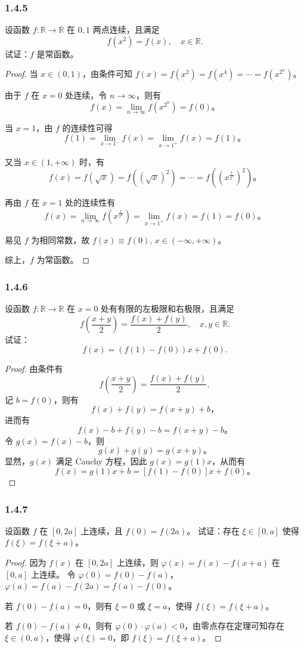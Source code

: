 \documentclass[12pt]{ctexart}
\begin{document}
\subsubsection*{1.4.5}
设函数 $f: \mathbb{R} \to \mathbb{R}$ 在 $0,1$ 两点连续，且满足
\[
f(x^2) = f(x), \quad x \in \mathbb{R}.
\]
试证：$f$ 是常函数。

\begin{proof}
当 $x \in (0,1)$，由条件可知 $f(x) = f(x^2) = f(x^4) = \cdots = f(x^{2^n})$。

由于 $f$ 在 $x=0$ 处连续，令 $n \to \infty$，则有
\[
f(x) = \lim_{n \to \infty} f(x^{2^n}) = f(0)。
\]

当 $x = 1$，由 $f$ 的连续性可得
\[
f(1) = \lim_{x \to 1^-} f(x) = \lim_{x \to 1^+} f(x) = f(1)。
\]

又当 $x \in (1,+\infty)$ 时，有
\[
f(x) = f(\sqrt{x}) = f((\sqrt{x})^2) = \cdots = f((x^{\frac{1}{2^n}})^2)。
\]

再由 $f$ 在 $x=1$ 处的连续性有
\[
f(x) = \lim_{n \to \infty} f(x^{\frac{1}{2^n}}) = \lim_{x \to 1^+} f(x) = f(1) = f(0)。
\]

易见 $f$ 为相同常数，故 $f(x) \equiv f(0), \, x \in (-\infty,+\infty)$。

综上，$f$ 为常函数。
\end{proof}

\subsubsection*{1.4.6}
设函数 $f:\mathbb{R} \to \mathbb{R}$ 在 $x=0$ 处有有限的左极限和右极限，且满足
\[
f\left(\frac{x+y}{2}\right) = \frac{f(x) + f(y)}{2}, \quad x, y \in \mathbb{R}.
\]
试证：
\[
f(x) = (f(1) - f(0))x + f(0).
\]

\begin{proof}
由条件有
\[
f\left(\frac{x+y}{2}\right) = \frac{f(x) + f(y)}{2},
\]
记 $b = f(0)$，则有
\[
f(x) + f(y) = f(x+y) + b，
\]
进而有
\[
f(x) - b + f(y) - b = f(x+y) - b。
\]
令 $g(x) = f(x) - b$，则
\[
g(x) + g(y) = g(x+y)。
\]
显然，$g(x)$ 满足 Cauchy 方程，因此 $g(x) = g(1)x$，从而有
\[
f(x) = g(1)x + b = [f(1) - f(0)]x + f(0)。
\]
\end{proof}

\subsubsection*{1.4.7}
设函数 $f$ 在 $[0, 2a]$ 上连续，且 $f(0) = f(2a)$。  
试证：存在 $\xi \in [0, a]$ 使得 $f(\xi) = f(\xi + a)$。
\begin{proof}
因为 $f(x)$ 在 $[0, 2a]$ 上连续，则 $\varphi(x) = f(x) - f(x + a)$ 在 $[0, a]$ 上连续。  
令 $\varphi(0) = f(0) - f(a)$，$\varphi(a) = f(a) - f(2a) = f(a) - f(0)$。

若 $f(0) - f(a) = 0$，则有 $\xi = 0$ 或 $\xi = a$，使得 $f(\xi) = f(\xi + a)$。

若 $f(0) - f(a) \neq 0$，则有 $\varphi(0) \cdot \varphi(a) < 0$，由零点存在定理可知存在 $\xi \in (0, a)$，使得 $\varphi(\xi) = 0$，即 $f(\xi) = f(\xi + a)$。
\end{proof}
\end{document}
